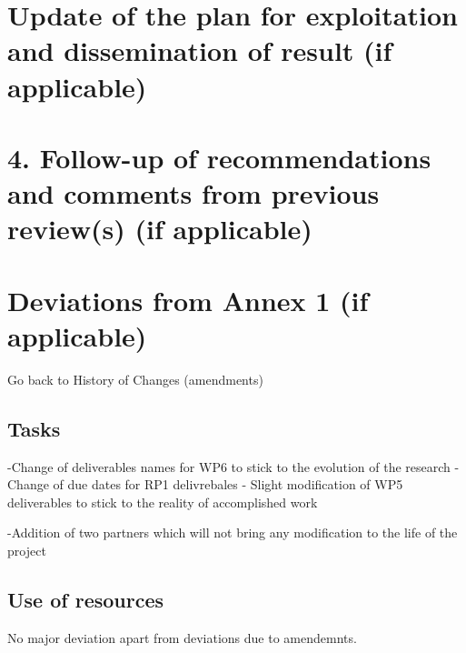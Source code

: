 \documentclass{deliverablereport}
\begin{document}


\section{Update of the plan for exploitation and dissemination of result (if applicable)}



\section{4. Follow-up of recommendations and comments from previous review(s) (if applicable)}


\section{Deviations from Annex 1 (if applicable)}

Go back to History of Changes (amendments)

\subsection{Tasks}
-Change of deliverables names for WP6 to stick to the evolution of the research
-Change of due dates for RP1 delivrebales
- Slight modification of WP5 deliverables to stick to the reality of accomplished work

-Addition of two partners which will not bring any modification to the life of the project


\subsection{Use of resources}
No major deviation apart from deviations due to amendemnts. 
\end{document}
